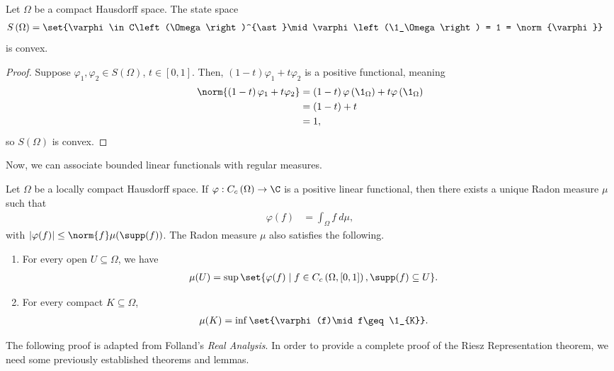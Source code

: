 \documentclass[10pt]{mypackage}
\begin{document}
\begin{corollary}
  Let $\Omega$ be a compact Hausdorff space. The state space
  \begin{align*}
    S\left(\Omega\right) &= \set{\varphi\in C\left(\Omega\right)^{\ast}\mid \varphi\left(\1_\Omega\right) = 1 = \norm{\varphi}}
  \end{align*}
  is convex.
\end{corollary}
\begin{proof}
  Suppose $\varphi_1 ,\varphi_2\in S(\Omega)$, $t\in [0,1]$. Then, $\left(1-t\right)\varphi_1 + t\varphi_2$ is a positive functional, meaning
  \begin{align*}
    \norm{\left(1-t\right)\varphi_1 + t\varphi_2} &= \left(1-t\right)\varphi\left(\1_\Omega\right) + t\varphi\left(\1_\Omega\right)\\
    &= \left(1-t\right) + t\\
    &= 1,
  \end{align*}
  so $S(\Omega)$ is convex.
\end{proof}
Now, we can associate bounded linear functionals with regular measures.
\begin{theorem}
  Let $\Omega$ be a locally compact Hausdorff space. If $\varphi: C_c\left(\Omega\right) \rightarrow \C$ is a positive linear functional, then there exists a unique Radon measure $\mu$ such that
  \begin{align*}
    \varphi(f) &= \int_{\Omega}f\:d\mu,
  \end{align*}
  with $\left\vert \varphi(f) \right\vert \leq \norm{f}\mu\!\left(\supp(f)\right)$. The Radon measure $\mu$ also satisfies the following.
  \begin{enumerate}[(1)]
    \item For every open $U\subseteq \Omega$, we have
      \begin{align*}
        \mu\!\left(U\right) &= \sup\set{\varphi(f)\mid f\in C_c\left(\Omega,[0,1]\right),\supp(f)\subseteq U}.
      \end{align*}
    \item For every compact $K\subseteq \Omega$,
      \begin{align*}
        \mu\!\left(K\right) &= \inf\set{\varphi(f)\mid f\geq \1_{K}}.
      \end{align*}
  \end{enumerate}
\end{theorem}
The following proof is adapted from Folland's \textit{Real Analysis}. In order to provide a complete proof of the Riesz Representation theorem, we need some previously established theorems and lemmas.
\end{document}
